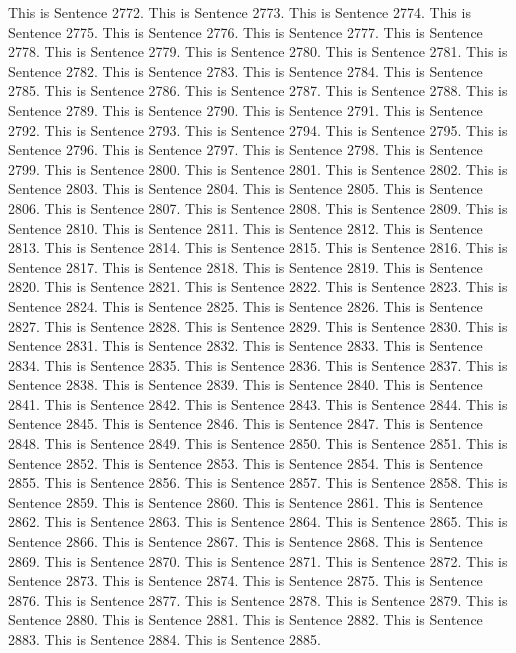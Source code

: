\documentclass{article}
\begin{document}
This is Sentence 2772.
This is Sentence 2773.
This is Sentence 2774.
This is Sentence 2775.
This is Sentence 2776.
This is Sentence 2777.
This is Sentence 2778.
This is Sentence 2779.
This is Sentence 2780.
This is Sentence 2781.
This is Sentence 2782.
This is Sentence 2783.
This is Sentence 2784.
This is Sentence 2785.
This is Sentence 2786.
This is Sentence 2787.
This is Sentence 2788.
This is Sentence 2789.
This is Sentence 2790.
This is Sentence 2791.
This is Sentence 2792.
This is Sentence 2793.
This is Sentence 2794.
This is Sentence 2795.
This is Sentence 2796.
This is Sentence 2797.
This is Sentence 2798.
This is Sentence 2799.
This is Sentence 2800.
This is Sentence 2801.
This is Sentence 2802.
This is Sentence 2803.
This is Sentence 2804.
This is Sentence 2805.
This is Sentence 2806.
This is Sentence 2807.
This is Sentence 2808.
This is Sentence 2809.
This is Sentence 2810.
This is Sentence 2811.
This is Sentence 2812.
This is Sentence 2813.
This is Sentence 2814.
This is Sentence 2815.
This is Sentence 2816.
This is Sentence 2817.
This is Sentence 2818.
This is Sentence 2819.
This is Sentence 2820.
This is Sentence 2821.
This is Sentence 2822.
This is Sentence 2823.
This is Sentence 2824.
This is Sentence 2825.
This is Sentence 2826.
This is Sentence 2827.
This is Sentence 2828.
This is Sentence 2829.
This is Sentence 2830.
This is Sentence 2831.
This is Sentence 2832.
This is Sentence 2833.
This is Sentence 2834.
This is Sentence 2835.
This is Sentence 2836.
This is Sentence 2837.
This is Sentence 2838.
This is Sentence 2839.
This is Sentence 2840.
This is Sentence 2841.
This is Sentence 2842.
This is Sentence 2843.
This is Sentence 2844.
This is Sentence 2845.
This is Sentence 2846.
This is Sentence 2847.
This is Sentence 2848.
This is Sentence 2849.
This is Sentence 2850.
This is Sentence 2851.
This is Sentence 2852.
This is Sentence 2853.
This is Sentence 2854.
This is Sentence 2855.
This is Sentence 2856.
This is Sentence 2857.
This is Sentence 2858.
This is Sentence 2859.
This is Sentence 2860.
This is Sentence 2861.
This is Sentence 2862.
This is Sentence 2863.
This is Sentence 2864.
This is Sentence 2865.
This is Sentence 2866.
This is Sentence 2867.
This is Sentence 2868.
This is Sentence 2869.
This is Sentence 2870.
This is Sentence 2871.
This is Sentence 2872.
This is Sentence 2873.
This is Sentence 2874.
This is Sentence 2875.
This is Sentence 2876.
This is Sentence 2877.
This is Sentence 2878.
This is Sentence 2879.
This is Sentence 2880.
This is Sentence 2881.
This is Sentence 2882.
This is Sentence 2883.
This is Sentence 2884.
This is Sentence 2885.
\end{document}
